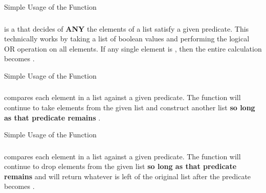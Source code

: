 \begin{listing}[h!tbp]
\caption{Simple Usage of the  Function}
\label{lst:All_Usage-Simple}
\end{listing}

\subsubsection{\texorpdfstring{}{\texttt{any}}}\label{subsubsec:Any_Function}
 is a  that decides of \textbf{ANY} the elements of a list satisfy a given predicate.
This technically works by taking a list of boolean values and performing the logical OR operation on all elements.
If any single element is , then the entire calculation becomes .

\begin{listing}[h!tbp]
\caption{Simple Usage of the  Function}
\label{lst:Any_Usage-Simple}
\end{listing}

\subsubsection{\texorpdfstring{}{\texttt{takeWhile}}}\label{subsubsec:TakeWhile_Function}
 compares each element in a list against a given predicate.
The function will continue to take elements from the given list and construct another list \textbf{so long as that predicate remains} .

\begin{listing}[h!tbp]
\caption{Simple Usage of the  Function}
\label{lst:TakeWhile_Usage-Simple}
\end{listing}

\subsubsection{\texorpdfstring{}{\texttt{dropWhile}}}\label{subsubsec:DropWhile_Function}
 compares each element in a list against a given predicate.
The function will continue to drop elements from the given list \textbf{so long as that predicate remains}  and will return whatever is left of the original list after the predicate becomes .

